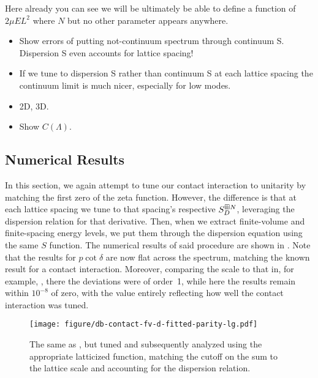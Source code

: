 Here already you can see we will be ultimately be able to define a function of $2\mu E L^2$ where $N$ but no other parameter appears anywhere.


\begin{itemize}
    \item Show errors of putting not-continuum spectrum through continuum S.  Dispersion S even accounts for lattice spacing!
    \item If we tune to dispersion S rather than continuum S at each lattice spacing the continuum limit is much nicer, especially for low modes.
    \item 2D, 3D.
    \item Show $C(\Lambda)$.
\end{itemize}

\subsection{Numerical Results}

In this section, we again attempt to tune our contact interaction to unitarity by matching the first zero of the \Luscher zeta function.
However, the difference is that at each lattice spacing we tune to that spacing's respective $S^{\boxplus N}_D$, leveraging the dispersion relation for that derivative.
Then, when we extract finite-volume and finite-spacing energy levels, we put them through the dispersion equation  using the same $S$ function.
The numerical results of said procedure are shown in .
Note that the results for $p\cot\delta$ are now flat across the spectrum, matching the known result for a contact interaction.
Moreover, comparing the scale to that in, for example, , there the deviations were of order~1, while here the results remain within $10^{-8}$ of zero, with the value entirely reflecting how well the contact interaction was tuned.

\begin{figure}
    \texttt{[image: figure/db-contact-fv-d-fitted-parity-lg.pdf]}
    \caption{The same as , but tuned and subsequently analyzed using the appropriate latticized \Luscher function, matching the cutoff on the sum to the lattice scale and accounting for the dispersion relation.}
    \label{fig:unimproved dispersion}
\end{figure}

